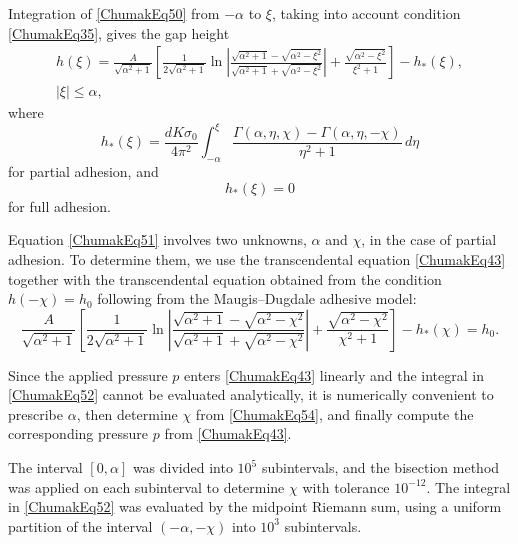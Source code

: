 Integration of \eqref{ChumakEq50} from $-\alpha$ to $\xi$, taking into account condition \eqref{ChumakEq35}, gives the gap height
\begin{multline}
	\label{ChumakEq51}
	h(\xi)
	=
	\frac{A}{\sqrt{\alpha^{2}+1}}
	\left[
	\frac{1}{2\sqrt{\alpha^{2}+1}}
	\ln\!\left|
	\frac{
		\sqrt{\alpha^{2}+1}-\sqrt{\alpha^{2}-\xi^{2}}
	}{
		\sqrt{\alpha^{2}+1}+\sqrt{\alpha^{2}-\xi^{2}}
	}
	\right|
	+
	\frac{\sqrt{\alpha^{2}-\xi^{2}}}{\xi^{2}+1}
	\right]
	-
	h_{*}(\xi),
	\\ |\xi|\le\alpha,
\end{multline}
where
\begin{equation}
	\label{ChumakEq52}
	h_{*}(\xi)
	=
	\frac{dK\sigma_{0}}{4\pi^{2}}
	\int_{-\alpha}^{\xi}
	\frac{
		\Gamma(\alpha,\eta,\chi)
		-
		\Gamma(\alpha,\eta,-\chi)
	}{
		\eta^{2}+1
	}
	\,d\eta
\end{equation}
for partial adhesion, and
\begin{equation}
	\label{ChumakEq53}
	h_{*}(\xi)=0
\end{equation}
for full adhesion.

Equation \eqref{ChumakEq51} involves two unknowns, $\alpha$ and $\chi$, in the case of partial adhesion. To determine them, we use the transcendental equation \eqref{ChumakEq43} together with the transcendental equation obtained from the condition $h(-\chi)=h_{0}$ following from the Maugis--Dugdale adhesive model:
\begin{equation}
	\label{ChumakEq54}
	\frac{A}{\sqrt{\alpha^{2}+1}}
	\left[
	\frac{1}{2\sqrt{\alpha^{2}+1}}
	\ln\!\left|
	\frac{
		\sqrt{\alpha^{2}+1}-\sqrt{\alpha^{2}-\chi^{2}}
	}{
		\sqrt{\alpha^{2}+1}+\sqrt{\alpha^{2}-\chi^{2}}
	}
	\right|
	+
	\frac{\sqrt{\alpha^{2}-\chi^{2}}}{\chi^{2}+1}
	\right]
	-h_{*}(\chi)
	= h_{0}.
\end{equation}

Since the applied pressure $p$ enters \eqref{ChumakEq43} linearly and the integral in \eqref{ChumakEq52} cannot be evaluated analytically, it is numerically convenient to prescribe $\alpha$, then determine $\chi$ from \eqref{ChumakEq54}, and finally compute the corresponding pressure $p$ from \eqref{ChumakEq43}.

The interval $[0,\alpha]$ was divided into $10^{5}$ subintervals, and the bisection method \cite{Chumak3} was applied on each subinterval to determine $\chi$ with tolerance $10^{-12}$. The integral in \eqref{ChumakEq52} was evaluated by the midpoint Riemann sum, using a uniform partition of the interval $(-\alpha,-\chi)$ into $10^{3}$ subintervals.

